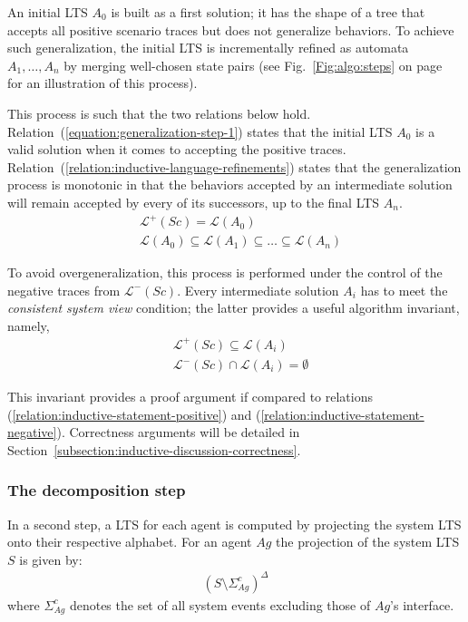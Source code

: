 An initial LTS $A_0$ is built as a first solution; it has the shape of a tree that accepts all positive scenario traces but does not generalize behaviors. To achieve such generalization, the initial LTS is incrementally refined as automata $A_1,\ldots,A_n$ by merging well-chosen state pairs (see Fig.~\ref{Fig:algo:steps} on page~\pageref{Fig:algo:steps} for an illustration of this process).

This process is such that the two relations below hold. Relation~(\ref{equation:generalization-step-1}) states that the initial LTS $A_0$ is a valid solution when it comes to accepting the positive traces. Relation~(\ref{relation:inductive-language-refinements}) states that the generalization process is monotonic in that the behaviors accepted by an intermediate solution will remain accepted by every of its successors, up to the final LTS $A_n$.
\begin{align}
&\mathcal{L}^+(Sc) = \mathcal{L}(A_0) \label{equation:generalization-step-1}\\
&\mathcal{L}(A_0) \subseteq \mathcal{L}(A_1) \subseteq \ldots \subseteq \mathcal{L}(A_n)
\label{relation:inductive-language-refinements}
\end{align}

To avoid overgeneralization, this process is performed under the control of the negative traces from $\mathcal{L}^-(Sc)$. Every intermediate solution $A_i$ has to meet the \emph{consistent system view} condition; the latter provides a useful algorithm invariant, namely,
\begin{align}
&\mathcal{L}^+(Sc) \subseteq \mathcal{L}(A_i)        \label{relation:inductive-invariant}\\
&\mathcal{L}^-(Sc) \cap \mathcal{L}(A_i) = \emptyset \label{relation:inductive-invariant-II}
\end{align}

This invariant provides a proof argument if compared to relations (\ref{relation:inductive-statement-positive}) and (\ref{relation:inductive-statement-negative}). Correctness arguments will be detailed in Section~\ref{subsection:inductive-discussion-correctness}.

\subsubsection*{The decomposition step}

In a second step, a LTS for each agent is computed by projecting the system LTS onto their respective alphabet. For an agent $Ag$ the projection of the system LTS $S$ is given by:
\begin{align}
(S \setminus \Sigma_{Ag}^c)^\Delta
\label{definition:decomposition-step}
\end{align}
\noindent where $\Sigma_{Ag}^c$ denotes the set of all system events excluding those of $Ag$'s interface.

